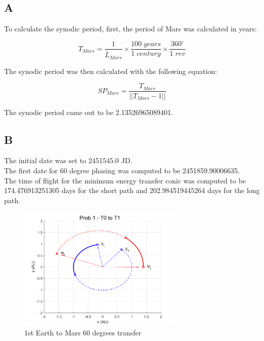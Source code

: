\documentclass[conf]{new-aiaa}
\begin{document}
\subsection*{A}

To calculate the synodic period, first, the period of Mars was calculated in years: 

\begin{equation}
    T_{Mars} = \frac{1}{\dot{L}_{Mars}} \times \frac{100 \; years}{1 \; century} \times \frac{360 ^\circ}{1 \; rev}
\end{equation}

The synodic period was then calculated with the following equation: 

\begin{equation}
    SP_{Mars} = \frac{T_{Mars}}{|| T_{Mars} - 1 ||}
\end{equation}

The synodic period came out to be 2.13526965089401. 

\subsection*{B}

The initial date was set to 2451545.0 JD. \\ 

The first date for 60 degree phasing was computed to be 2451859.90006635. \\ 

The time of flight for the minimum energy transfer conic was computed to be 174.476913251305 days for the short path and 202.984519445264 days for the long path. \\  

\begin{figure}[H]
    \centering 
    \includegraphics[width=0.7\textwidth]{Prob 1 - T0 to T1.pdf}
    \caption{1st Earth to Mars 60 degrees transfer}
\end{figure}
\end{document}
